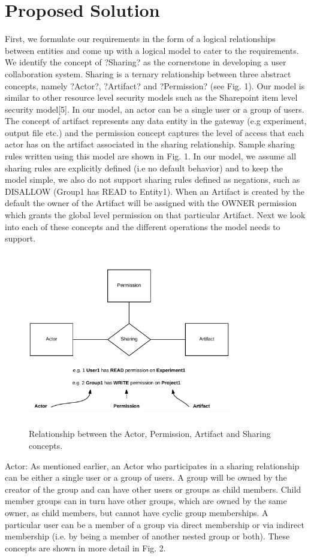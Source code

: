 \documentclass[sigconf]{acmart}
\begin{document}
\section{Proposed Solution}
First, we formulate our requirements in the form of a logical relationships between entities and come up with a logical model to cater to the requirements. We identify the concept of ?Sharing? as the cornerstone in developing a user collaboration system. Sharing is a ternary relationship between three abstract concepts, namely ?Actor?, ?Artifact? and ?Permission? (see Fig. 1). Our model is similar to other resource level security models such as the Sharepoint item level security model[5]. In our model, an actor can be a single user or a group of users. The concept of artifact represents any data entity in the gateway (e.g experiment, output file etc.) and the permission concept captures the level of access that each actor has on the artifact associated in the sharing relationship. Sample sharing rules written using this model are shown in Fig. 1. In our model, we assume all sharing rules are explicitly defined (i.e no default behavior) and to keep the model simple, we also do not support sharing rules defined as negations, such as DISALLOW (Group1 has READ to Entity1). When an Artifact is created by the default the owner of the Artifact will be assigned with the OWNER permission which grants the global level permission on that particular Artifact. Next we look into each of these concepts and the different operations the model needs to support.

\begin{figure}
\includegraphics[height=3in, width=3.5in]{figures/sharing-concepts.pdf}
\caption{Relationship between the Actor, Permission, Artifact and Sharing concepts.}
\end{figure}
Actor: As mentioned earlier, an Actor who participates in a sharing relationship can be either a single user or a group of users. A group will be owned by the creator of the group and can have other users or groups as child members. Child member groups can in turn have other groups, which are owned by the same owner, as child members, but cannot have cyclic group memberships. A particular user can be a member of a group via direct membership or via indirect membership (i.e. by being a member of another nested group or both). These concepts are shown in more detail in Fig. 2.
\end{document}
